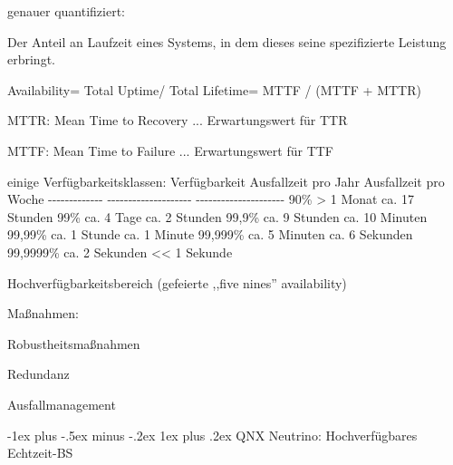 \documentclass[a4paper]{article}
\makeatletter
\renewcommand{\subsubsection}{\@startsection{subsubsection}{3}{0mm}%
 {-1ex plus -.5ex minus -.2ex}%
 {1ex plus .2ex}%
 {\normalfont\small\bfseries}}
\makeatother
\begin{document}
\begin{multicols}{3}
    genauer quantifiziert:

    \begin{itemize*}
        \item
        Der Anteil an Laufzeit eines Systems, in dem dieses seine
        spezifizierte Leistung erbringt.
        \item
        \item
        Availability= Total Uptime/ Total Lifetime= MTTF / (MTTF + MTTR)
        \begin{itemize*}
            \item MTTR: Mean Time to Recovery ... Erwartungswert für TTR
            \item MTTF: Mean Time to Failure ... Erwartungswert für TTF
        \end{itemize*}
        \item
        einige Verfügbarkeitsklassen: \textbar{} Verfügbarkeit \textbar{}
        Ausfallzeit pro Jahr \textbar{} Ausfallzeit pro Woche \textbar{}
        \textbar{} -\/-\/-\/-\/-\/-\/-\/-\/-\/-\/-\/-\/- \textbar{}
        -\/-\/-\/-\/-\/-\/-\/-\/-\/-\/-\/-\/-\/-\/-\/-\/-\/-\/-\/- \textbar{}
        -\/-\/-\/-\/-\/-\/-\/-\/-\/-\/-\/-\/-\/-\/-\/-\/-\/-\/-\/-\/-
        \textbar{} \textbar{} 90\% \textbar{} \textgreater{} 1 Monat
        \textbar{} ca. 17 Stunden \textbar{} \textbar{} 99\% \textbar{} ca. 4
        Tage \textbar{} ca. 2 Stunden \textbar{} \textbar{} 99,9\% \textbar{}
        ca. 9 Stunden \textbar{} ca. 10 Minuten \textbar{} \textbar{} 99,99\%
        \textbar{} ca. 1 Stunde \textbar{} ca. 1 Minute \textbar{} \textbar{}
        99,999\% \textbar{} ca. 5 Minuten \textbar{} ca. 6 Sekunden \textbar{}
        \textbar{} 99,9999\% \textbar{} ca. 2 Sekunden \textbar{}
        \textless\textless{} 1 Sekunde \textbar{}
        \item
        Hochverfügbarkeitsbereich (gefeierte ,,five nines'' availability)
        \item
        Maßnahmen:
        \item
        Robustheitsmaßnahmen
        \item
        Redundanz
        \item
        Ausfallmanagement
    \end{itemize*}


    \subsubsection{QNX Neutrino: Hochverfügbares
        Echtzeit-BS}


\end{multicols}
\end{document}
